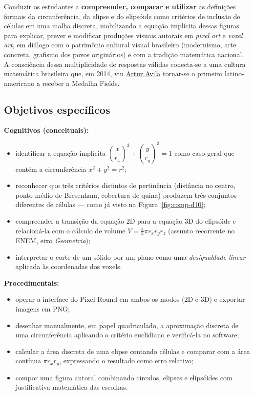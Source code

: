 \documentclass[12pt,a4paper]{scrartcl}
\newcommand{\acc}[1]{\textcolor{accent}{\textbf{#1}}}
\begin{document}
Conduzir os estudantes a \acc{compreender, comparar e utilizar} as definições formais da circunferência, da elipse e do elipsóide como critérios de inclusão de células em uma malha discreta, mobilizando a equação implícita dessas figuras para explicar, prever e modificar produções visuais autorais em \emph{pixel art} e \emph{voxel art}, em diálogo com o patrimônio cultural visual brasileiro (modernismo, arte concreta, grafismo dos povos originários) e com a tradição matemática nacional. A consciência dessa multiplicidade de respostas válidas conecta-se a uma cultura matemática brasileira que, em 2014, viu \hyperref[sec:obmep]{Artur Avila} tornar-se o primeiro latino-americano a receber a Medalha Fields.

\subsection{Objetivos específicos}

\textbf{Cognitivos (conceituais):}
\begin{itemize}[leftmargin=1.3em,itemsep=0.2em,topsep=0.3em]
  \item identificar a equação implícita $\left(\dfrac{x}{r_x}\right)^{\!2} + \left(\dfrac{y}{r_y}\right)^{\!2} = 1$ como caso geral que contém a circunferência $x^2 + y^2 = r^2$;
  \item reconhecer que três critérios distintos de pertinência (distância no centro, ponto médio de Bresenham, cobertura de quina) produzem três conjuntos diferentes de células --- como já visto na Figura~\ref{fig:comp-d10};
  \item compreender a transição da equação 2D para a equação 3D do elipsóide e relacioná-la com o cálculo de volume $V = \tfrac{4}{3}\pi r_x r_y r_z$ (assunto recorrente no ENEM, eixo \emph{Geometria});
  \item interpretar o corte de um sólido por um plano como uma \emph{desigualdade linear} aplicada às coordenadas dos voxels.
\end{itemize}

\textbf{Procedimentais:}
\begin{itemize}[leftmargin=1.3em,itemsep=0.2em,topsep=0.3em]
  \item operar a interface do Pixel Round em ambos os modos (2D e 3D) e exportar imagens em PNG;
  \item desenhar manualmente, em papel quadriculado, a aproximação discreta de uma circunferência aplicando o critério euclidiano e verificá-la no software;
  \item calcular a área discreta de uma elipse contando células e comparar com a área contínua $\pi r_x r_y$, expressando o resultado como erro relativo;
  \item compor uma figura autoral combinando círculos, elipses e elipsóides com justificativa matemática das escolhas.
\end{itemize}
\end{document}
